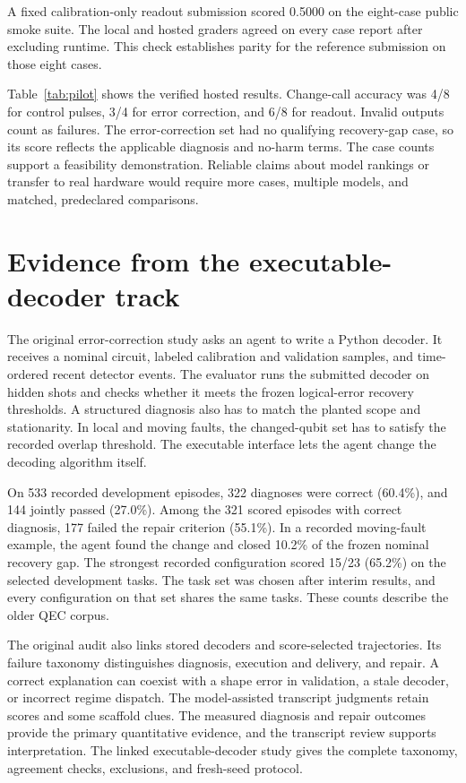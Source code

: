 \documentclass{article}
\begin{document}
A fixed calibration-only readout submission scored 0.5000 on the eight-case public smoke suite. The local and hosted graders agreed on every case report after excluding runtime. This check establishes parity for the reference submission on those eight cases.

Table~\ref{tab:pilot} shows the verified hosted results. Change-call accuracy was 4/8 for control pulses, 3/4 for error correction, and 6/8 for readout. Invalid outputs count as failures. The error-correction set had no qualifying recovery-gap case, so its score reflects the applicable diagnosis and no-harm terms. The case counts support a feasibility demonstration. Reliable claims about model rankings or transfer to real hardware would require more cases, multiple models, and matched, predeclared comparisons.

\balance
\section{Evidence from the executable-decoder track}
\label{sec:decoder}
The original error-correction study asks an agent to write a Python decoder. It receives a nominal circuit, labeled calibration and validation samples, and time-ordered recent detector events. The evaluator runs the submitted decoder on hidden shots and checks whether it meets the frozen logical-error recovery thresholds. A structured diagnosis also has to match the planted scope and stationarity. In local and moving faults, the changed-qubit set has to satisfy the recorded overlap threshold. The executable interface lets the agent change the decoding algorithm itself.

On 533 recorded development episodes, 322 diagnoses were correct (60.4\%), and 144 jointly passed (27.0\%). Among the 321 scored episodes with correct diagnosis, 177 failed the repair criterion (55.1\%). In a recorded moving-fault example, the agent found the change and closed 10.2\% of the frozen nominal recovery gap. The strongest recorded configuration scored 15/23 (65.2\%) on the selected development tasks. The task set was chosen after interim results, and every configuration on that set shares the same tasks. These counts describe the older QEC corpus.

The original audit also links stored decoders and score-selected trajectories. Its failure taxonomy distinguishes diagnosis, execution and delivery, and repair. A correct explanation can coexist with a shape error in validation, a stale decoder, or incorrect regime dispatch. The model-assisted transcript judgments retain scores and some scaffold clues. The measured diagnosis and repair outcomes provide the primary quantitative evidence, and the transcript review supports interpretation. The linked executable-decoder study gives the complete taxonomy, agreement checks, exclusions, and fresh-seed protocol.
\end{document}
